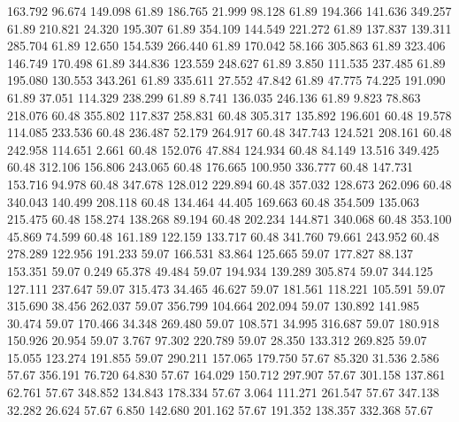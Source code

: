  163.792   96.674  149.098        61.89
 186.765   21.999   98.128        61.89
 194.366  141.636  349.257        61.89
 210.821   24.320  195.307        61.89
 354.109  144.549  221.272        61.89
 137.837  139.311  285.704        61.89
  12.650  154.539  266.440        61.89
 170.042   58.166  305.863        61.89
 323.406  146.749  170.498        61.89
 344.836  123.559  248.627        61.89
   3.850  111.535  237.485        61.89
 195.080  130.553  343.261        61.89
 335.611   27.552   47.842        61.89
  47.775   74.225  191.090        61.89
  37.051  114.329  238.299        61.89
   8.741  136.035  246.136        61.89
   9.823   78.863  218.076        60.48
 355.802  117.837  258.831        60.48
 305.317  135.892  196.601        60.48
  19.578  114.085  233.536        60.48
 236.487   52.179  264.917        60.48
 347.743  124.521  208.161        60.48
 242.958  114.651    2.661        60.48
 152.076   47.884  124.934        60.48
  84.149   13.516  349.425        60.48
 312.106  156.806  243.065        60.48
 176.665  100.950  336.777        60.48
 147.731  153.716   94.978        60.48
 347.678  128.012  229.894        60.48
 357.032  128.673  262.096        60.48
 340.043  140.499  208.118        60.48
 134.464   44.405  169.663        60.48
 354.509  135.063  215.475        60.48
 158.274  138.268   89.194        60.48
 202.234  144.871  340.068        60.48
 353.100   45.869   74.599        60.48
 161.189  122.159  133.717        60.48
 341.760   79.661  243.952        60.48
 278.289  122.956  191.233        59.07
 166.531   83.864  125.665        59.07
 177.827   88.137  153.351        59.07
   0.249   65.378   49.484        59.07
 194.934  139.289  305.874        59.07
 344.125  127.111  237.647        59.07
 315.473   34.465   46.627        59.07
 181.561  118.221  105.591        59.07
 315.690   38.456  262.037        59.07
 356.799  104.664  202.094        59.07
 130.892  141.985   30.474        59.07
 170.466   34.348  269.480        59.07
 108.571   34.995  316.687        59.07
 180.918  150.926   20.954        59.07
   3.767   97.302  220.789        59.07
  28.350  133.312  269.825        59.07
  15.055  123.274  191.855        59.07
 290.211  157.065  179.750        57.67
  85.320   31.536    2.586        57.67
 356.191   76.720   64.830        57.67
 164.029  150.712  297.907        57.67
 301.158  137.861   62.761        57.67
 348.852  134.843  178.334        57.67
   3.064  111.271  261.547        57.67
 347.138   32.282   26.624        57.67
   6.850  142.680  201.162        57.67
 191.352  138.357  332.368        57.67
